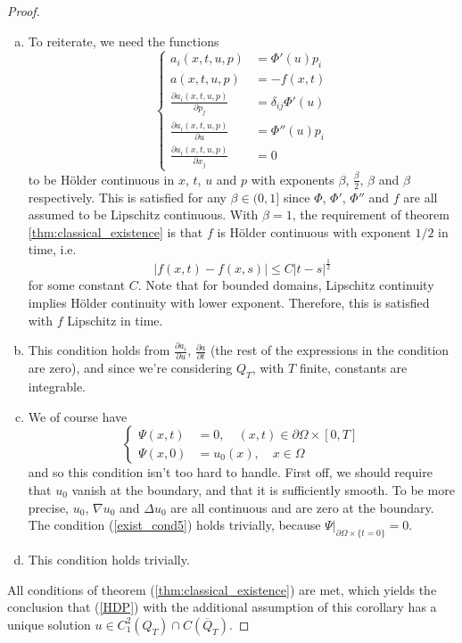 \documentclass[11pt, a4paper]{article}
\begin{document}
\begin{proof}
\begin{enumerate}[a)]
	\item To reiterate, we need the functions
	\begin{equation*}
		\begin{cases}
			a_i(x,t,u,p) &= \Phi'(u)p_i \\
			a(x,t,u,p) &= -f(x,t) \\
			\frac{\partial a_i(x,t,u,p)}{\partial p_j} &= \delta_{ij}\Phi'(u) \\
			\frac{\partial a_i(x,t,u,p)}{\partial u} &= \Phi''(u)p_i \\
			\frac{\partial a_i(x,t,u,p)}{\partial x_j} &= 0
		\end{cases}
	\end{equation*}
	to be Hölder continuous in $x$, $t$, $u$ and $p$ with exponents $\beta$, $\frac{\beta}{2}$, $\beta$ and $\beta$ respectively. This is satisfied for any $\beta \in (0,1]$ since $\Phi$, $\Phi'$, $\Phi''$ and $f$ are all assumed to be Lipschitz continuous.
	With $\beta = 1$, the requirement of theorem \ref{thm:classical_existence} is that $f$ is Hölder continuous with exponent $1/2$ in time, i.e.
	\begin{equation*}
	|f(x,t) - f(x,s)| \leq C|t-s|^\frac{1}{2}
	\end{equation*}
	for some constant $C$. Note that for bounded domains, Lipschitz continuity implies Hölder continuity with lower exponent. Therefore, this is satisfied with $f$ Lipschitz in time.
	
	\item This condition holds from $\frac{\partial a_i}{\partial u}$, $\frac{\partial a}{\partial t}$ (the rest of the expressions in the condition are zero), and since we're considering $Q_T$, with $T$ finite, constants are integrable.
	
	\item We of course have
	\begin{equation*}
		\begin{cases}
		\Psi(x,t) &= 0, \quad (x,t) \in \partial \Omega \times [0,T] \\
		\Psi(x,0) &= u_0(x), \quad x\in \Omega 
		\end{cases}
	\end{equation*}
	and so this condition isn't too hard to handle. First off, we should require that $u_0$ vanish at the boundary, and that it is sufficiently smooth. To be more precise, $u_0$, $\nabla u_0$ and $\Delta u_0$ are all continuous and are zero at the boundary. The condition (\ref{exist_cond5}) holds trivially, because  $\Psi\big|_{\partial \Omega \times \{t=0\}} = 0$.
	
	\item This condition holds trivially.
\end{enumerate}
All conditions of theorem (\ref{thm:classical_existence}) are met, which yields the conclusion that (\ref{HDP}) with the additional assumption of this corollary has a unique solution $u \in C^2_1(Q_T)\cap C(\overline{Q}_T)$.
\end{proof}
\end{document}
